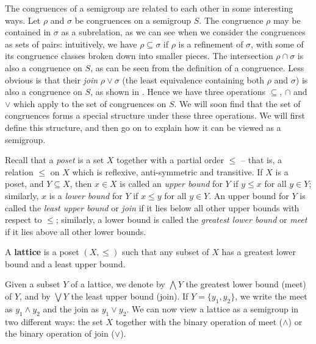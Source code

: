 The congruences of a semigroup are related to each other in some interesting
ways.  Let $\rho$ and $\sigma$ be congruences on a semigroup $S$.  The
congruence $\rho$ may be contained in $\sigma$ as a subrelation, as we can see
when we consider the congruences as sets of pairs: intuitively, we have
$\rho \subseteq \sigma$ if $\rho$ is a refinement of $\sigma$, with some of its
congruence classes broken down into smaller pieces.  The intersection
$\rho \cap \sigma$ is also a congruence on $S$, as can be seen from the
definition of a congruence.  Less obvious is that their \textit{join}
$\rho \vee \sigma$ (the least equivalence containing both $\rho$ and $\sigma$)
is also a congruence on $S$, as shown in \cite[\S1.5]{howie}.  Hence we have
three operations $\subseteq$, $\cap$ and $\vee$ which apply to the set of
congruences on $S$.  We will soon find that the set of congruences forms a
special structure under these three operations.  We will first define this
structure, and then go on to explain how it can be viewed as a semigroup.

Recall that a \textit{poset} is a set $X$ together with a partial order $\leq$
-- that is, a relation $\leq$ on $X$ which is reflexive, anti-symmetric and
transitive.  If $X$ is a poset, and $Y \subseteq X$, then $x \in X$ is called an
\textit{upper bound} for $Y$ if $y \leq x$ for all $y \in Y$; similarly, $x$ is
a \textit{lower bound} for $Y$ if $x \leq y$ for all $y \in Y$.  An upper bound
for $Y$ is called the \textit{least upper bound} or \textit{join} if it lies
below all other upper bounds with respect to $\leq$; similarly, a lower bound is
called the \textit{greatest lower bound} or \textit{meet} if it lies above all
other lower bounds.    
   

\begin{definition}
  \label{def:lattice}
  A \textbf{lattice} is a poset $(X, \leq)$ such that any subset of $X$ has
  a greatest lower bound and a least upper bound.
\end{definition}

Given a subset $Y$ of a lattice, we denote by $\bigwedge Y$ the greatest lower
bound (meet) of $Y$, and by $\bigvee Y$ the least upper bound (join).  If
$Y = \{y_1, y_2\}$, we write the meet as $y_1 \wedge y_2$ and the join as
$y_1 \vee y_2$.  We can now view a lattice as a semigroup in two different ways:
the set $X$ together with the binary operation of meet ($\wedge$) or the binary
operation of join ($\vee$).

